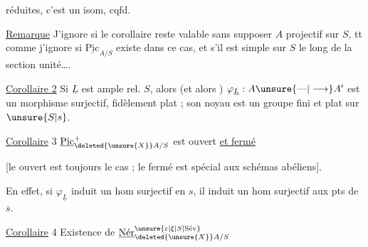réduites, c'est un isom, cqfd.

\uline{Remarque} J'ignore si le corollaire reste valable sans supposer $A$ projectif sur $S$, tt comme j'ignore si $\underline{\mathrm{Pic}}_{A/S}$ existe dans ce cas, et s'il est  simple sur $S$ le long de la section unité\ldots.

\uline{Corollaire 2} Si $\underline L$ est ample rel.  $S$, alors (et alors ) $\varphi_{\underline L}:A\unsure{\text{---}|\longrightarrow} A'$ est un morphisme surjectif,   fidèlement plat ; son noyau est un groupe fini et plat sur $\unsure{S|s}$.

\uline{Corollaire} 3 $\underline{\mathrm{Pic}}^+_{\deleted{\unsure{X}}A/S}$ est ouvert \uline{et fermé}

[le ouvert est toujours le cas ; le fermé est spécial aux schémas abéliens].

En effet, si $\varphi_{\underline L}$ induit un hom surjectif en $s$, il induit un hom surjectif aux pts de $\overline s$.

\uline{Corollaire} 4 Existence de $\underline{\text{Nér}}^{\unsure{\varepsilon|\xi|S|\text{Sév}}}_{\deleted{\unsure{X}}A/S}$

